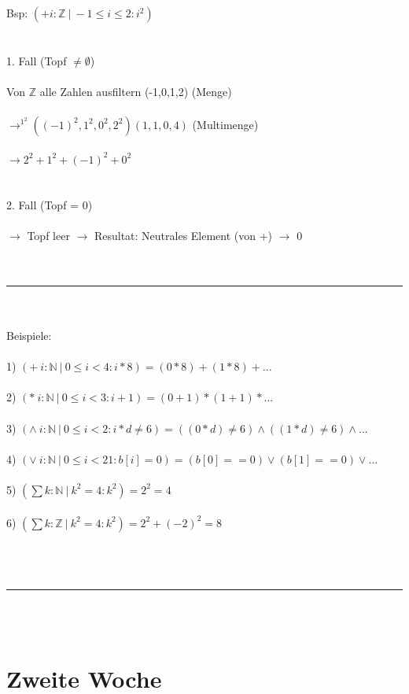 \documentclass[18pt,a4paper]{article}
\begin{document}
Bsp: $(+ i:\mathbb{Z} \:\vert\: -1\leqslant i\leqslant 2 : i^2)$\\
\\
\\
1. Fall (Topf $\neq \emptyset$)\\
\\
Von $\mathbb{Z}$ alle Zahlen ausfiltern (-1,0,1,2) (Menge)\\
\\
$\rightarrow^{1^2} ((-1)^2, 1^2, 0^2, 2^2) (1,1,0,4)$ (Multimenge)\\
\\
$\rightarrow 2^2 + 1^2 + (-1)^2 + 0^2$\\
\\
\\
2. Fall (Topf = 0)\\
\\
$\rightarrow$ Topf leer $\rightarrow$ Resultat: Neutrales Element (von +) $\rightarrow$ 0\\
\\
\\
\rule{\textwidth}{0.4mm}\\
\\
Beispiele:\\
\\
1) $(+ \:i:\mathbb{N} \:\vert\: 0\leqslant i < 4 : i*8) = (0*8) + (1*8) + ... $\\
\\
2) $(* \:i:\mathbb{N} \:\vert\: 0\leqslant i < 3 : i+1) = (0+1) * (1+1) * ... $\\
\\
3) $(\wedge \:i:\mathbb{N} \:\vert\: 0\leqslant i < 2 : i*d \neq 6) = ((0*d) \neq 6) \wedge ((1*d) \neq 6) \wedge ...  $\\
\\
4) $(\vee \:i:\mathbb{N} \:\vert\: 0\leqslant i < 21 : b[i]=0) = (b[0] == 0) \vee (b[1] == 0) \vee ...  $\\
\\
5) $(\sum k : \mathbb{N} \:\vert\: k^2 = 4 : k^2) = 2^2 = 4$\\
\\
6) $(\sum k : \mathbb{Z} \:\vert\: k^2 = 4 : k^2) = 2^2 + (-2)^2 = 8$\\
\\
\\
\\
\rule{\textwidth}{0.4mm}\\
\\


\section{Zweite Woche}
\end{document}
